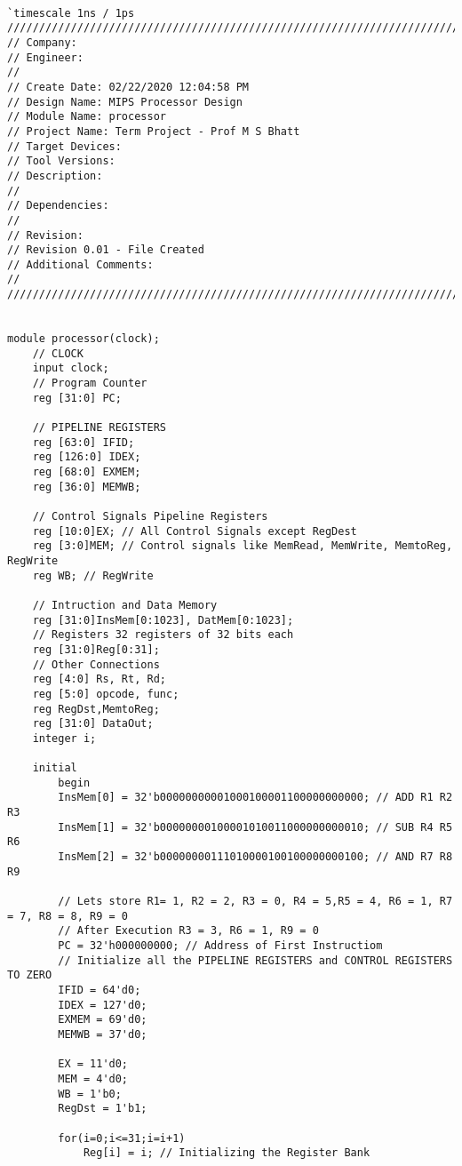 \documentclass{article}
\begin{document}
\lstset{numbers=left, numberstyle=\tiny, language=C}
\begin{lstlisting}[caption={ .}, label={lst:exemplo}, firstnumber=1, frame=single]

`timescale 1ns / 1ps
//////////////////////////////////////////////////////////////////////////////////
// Company: 
// Engineer: 
// 
// Create Date: 02/22/2020 12:04:58 PM
// Design Name: MIPS Processor Design
// Module Name: processor
// Project Name: Term Project - Prof M S Bhatt
// Target Devices: 
// Tool Versions: 
// Description: 
// 
// Dependencies: 
// 
// Revision:
// Revision 0.01 - File Created
// Additional Comments:
// 
//////////////////////////////////////////////////////////////////////////////////


module processor(clock);
    // CLOCK
    input clock; 
    // Program Counter
    reg [31:0] PC;
    
    // PIPELINE REGISTERS
    reg [63:0] IFID;
    reg [126:0] IDEX;
    reg [68:0] EXMEM;
    reg [36:0] MEMWB;
    
    // Control Signals Pipeline Registers
    reg [10:0]EX; // All Control Signals except RegDest
    reg [3:0]MEM; // Control signals like MemRead, MemWrite, MemtoReg, RegWrite
    reg WB; // RegWrite
    
    // Intruction and Data Memory
    reg [31:0]InsMem[0:1023], DatMem[0:1023];
    // Registers 32 registers of 32 bits each
    reg [31:0]Reg[0:31];
    // Other Connections
    reg [4:0] Rs, Rt, Rd;
    reg [5:0] opcode, func;
    reg RegDst,MemtoReg;
    reg [31:0] DataOut;
    integer i;

    initial
        begin
        InsMem[0] = 32'b00000000001000100001100000000000; // ADD R1 R2 R3
        InsMem[1] = 32'b00000000100001010011000000000010; // SUB R4 R5 R6
        InsMem[2] = 32'b00000000111010000100100000000100; // AND R7 R8 R9
        
        // Lets store R1= 1, R2 = 2, R3 = 0, R4 = 5,R5 = 4, R6 = 1, R7 = 7, R8 = 8, R9 = 0
        // After Execution R3 = 3, R6 = 1, R9 = 0
        PC = 32'h000000000; // Address of First Instructiom
        // Initialize all the PIPELINE REGISTERS and CONTROL REGISTERS TO ZERO
        IFID = 64'd0;
        IDEX = 127'd0;
        EXMEM = 69'd0;
        MEMWB = 37'd0;
        
        EX = 11'd0;
        MEM = 4'd0;
        WB = 1'b0;
        RegDst = 1'b1;
        
        for(i=0;i<=31;i=i+1) 
            Reg[i] = i; // Initializing the Register Bank
      

\end{lstlisting}
\end{document}
